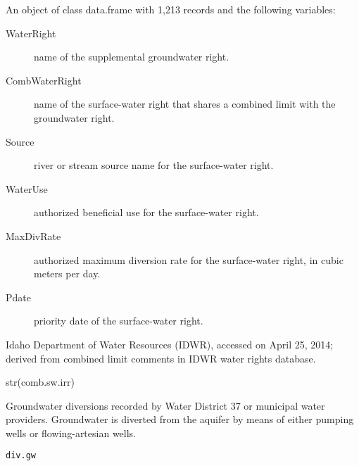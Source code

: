 \documentclass[a4paper]{book}
\begin{document}
%
\begin{Format}
An object of class data.frame with 1,213 records and the following variables:
\begin{description}

\item[WaterRight] name of the supplemental groundwater right.
\item[CombWaterRight] name of the surface-water right that shares a
combined limit with the groundwater right.
\item[Source] river or stream source name for the surface-water right.
\item[WaterUse] authorized beneficial use for the surface-water right.
\item[MaxDivRate] authorized maximum diversion rate for the surface-water right,
in cubic meters per day.
\item[Pdate] priority date of the surface-water right.

\end{description}

\end{Format}
%
\begin{Source}\relax
Idaho Department of Water Resources (IDWR), accessed on April 25, 2014;
derived from combined limit comments in IDWR water rights database.
\end{Source}
%
\begin{Examples}
\begin{ExampleCode}
str(comb.sw.irr)

\end{ExampleCode}
\end{Examples}
%
\begin{Description}\relax
Groundwater diversions recorded by Water District 37 or municipal water providers.
Groundwater is diverted from the aquifer by means of either pumping wells or
flowing-artesian wells.
\end{Description}
%
\begin{Usage}
\begin{verbatim}
div.gw
\end{verbatim}
\end{Usage}
%
\end{document}
